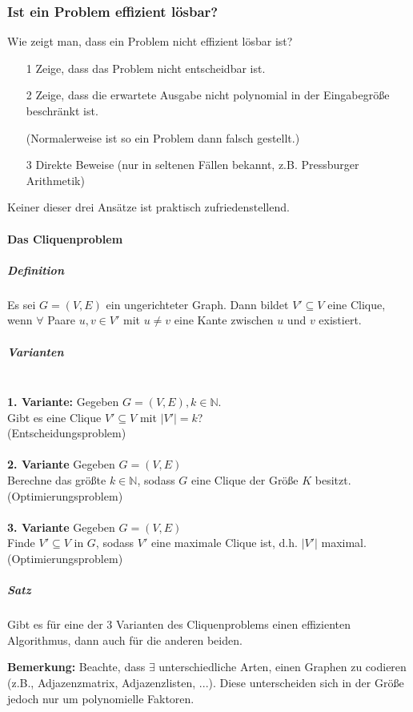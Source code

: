 \documentclass[fleqn]{scrartcl}
\begin{document}
\subsubsection{Ist ein Problem effizient lösbar?}
Wie zeigt man, dass ein Problem nicht effizient lösbar ist?
\begin{itemize}
\item[1] Zeige, dass das Problem nicht entscheidbar ist.
\item[2] Zeige, dass die erwartete Ausgabe nicht polynomial in der Eingabegröße beschränkt ist. 

(Normalerweise ist so ein Problem dann falsch gestellt.)
\item[3] Direkte Beweise (nur in seltenen Fällen bekannt, z.B. Pressburger Arithmetik)
\end{itemize}

Keiner dieser drei Ansätze ist praktisch zufriedenstellend.

\newpage
\paragraph{Das Cliquenproblem}
\subparagraph{Definition}
Es sei $G = (V, E)$ ein ungerichteter Graph. Dann bildet $V' \subseteq V$ eine Clique, wenn $\forall$ Paare $u, v \in V'$ mit $u \neq v$ eine Kante zwischen $u$ und $v$ existiert.

\subparagraph{Varianten} $ $\\
\textbf{1. Variante:} Gegeben $G = (V, E), k \in \mathbb{N}$.\\
Gibt es eine Clique $V' \subseteq V$ mit $|V'| = k$?\\ (Entscheidungsproblem)\\\\
\textbf{2. Variante} Gegeben $G = (V, E)$\\
Berechne das größte $k \in \mathbb{N}$, sodass $G$ eine Clique der Größe $K$ besitzt.\\
(Optimierungsproblem)\\\\
\textbf{3. Variante} Gegeben $G = (V, E)$\\
Finde $V' \subseteq V$ in $G$, sodass $V'$ eine maximale Clique ist, d.h. $|V'|$ maximal.\\
(Optimierungsproblem) 

\subparagraph{Satz} Gibt es für eine der 3 Varianten des Cliquenproblems einen effizienten Algorithmus, dann auch für die anderen beiden.

\textbf{Bemerkung:} Beachte, dass $\exists$ unterschiedliche Arten, einen Graphen zu codieren (z.B., Adjazenzmatrix, Adjazenzlisten, ...). Diese unterscheiden sich in der Größe jedoch nur um polynomielle Faktoren.
\end{document}
